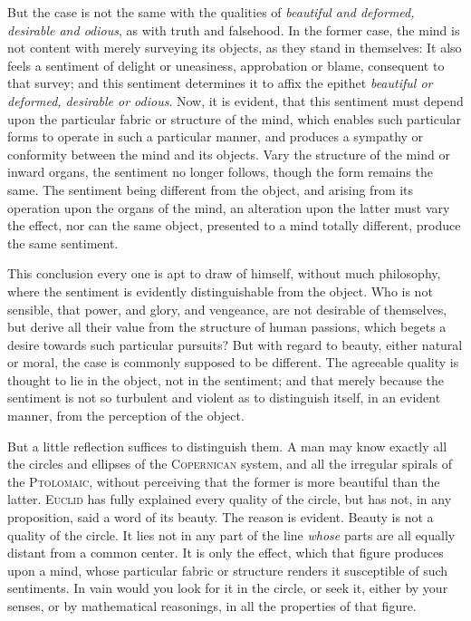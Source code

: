 But the case is not the same with the qualities of \textit{beautiful
and deformed, desirable and odious}, as with truth and falsehood. In
the former case, the mind is not content with merely surveying its
objects, as they stand in themselves: It also feels a sentiment of
delight or uneasiness, approbation or blame, consequent to that
survey; and this sentiment determines it to affix the epithet
\textit{beautiful or deformed, desirable or odious}. Now, it is
evident, that this sentiment must depend upon the particular fabric or
structure of the mind, which enables such particular forms to operate
in such a particular manner, and produces a sympathy or conformity
between the mind and its objects. Vary the structure of the mind or
inward organs, the sentiment no longer follows, though the form
remains the same. The sentiment being different from the object, and
arising from its operation upon the organs of the mind, an alteration
upon the latter must vary the effect, nor can the same object,
presented to a mind totally different, produce the same sentiment.

This conclusion every one is apt to draw of himself, without much
philosophy, where the sentiment is evidently distinguishable from the
object. Who is not sensible, that power, and glory, and vengeance, are
not desirable of themselves, but derive all their value from the
structure of human passions, which begets a desire towards such
particular pursuits? But with regard to beauty, either natural or
moral, the case is commonly supposed to be different. The agreeable
quality is thought to lie in the object, not in the sentiment; and
that merely because the sentiment is not so turbulent and violent as
to distinguish itself, in an evident manner, from the perception of
the object.

But a little reflection suffices to distinguish them. A man may know
exactly all the circles and ellipses of the \textsc{Copernican}
system, and all the irregular spirals of the \textsc{Ptolomaic},
without perceiving that the former is more beautiful than 
the latter. \textsc{Euclid} has fully explained every quality of the
circle, but has not, in any proposition, said a word of its beauty.
The reason is evident. Beauty is not a quality of the circle. It lies
not in any part of the line \textit{whose} parts are all equally
distant from a common center. It is only the effect, which that figure
produces upon a mind, whose particular fabric or structure renders it
susceptible of such sentiments. In vain would you look for it in the
circle, or seek it, either by your senses, or by mathematical
reasonings, in all the properties of that figure.

